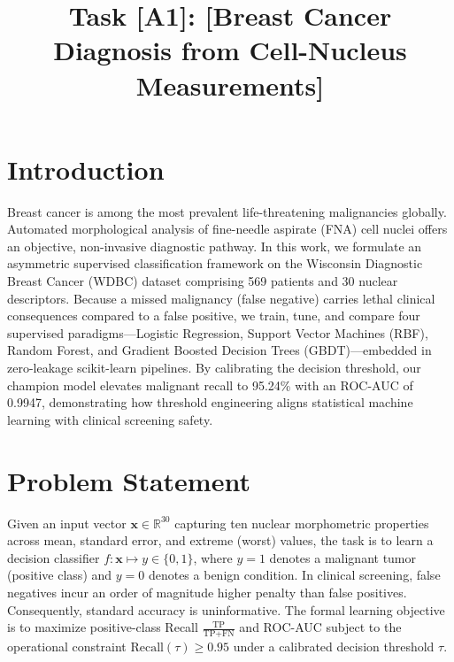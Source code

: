 \documentclass[conference]{IEEEtran}
\begin{document}
\title{Task [A1]: [Breast Cancer Diagnosis from Cell-Nucleus Measurements]}

\author{
}

\maketitle

\section{Introduction}
Breast cancer is among the most prevalent life-threatening malignancies globally. Automated morphological analysis of fine-needle aspirate (FNA) cell nuclei offers an objective, non-invasive diagnostic pathway. In this work, we formulate an asymmetric supervised classification framework on the Wisconsin Diagnostic Breast Cancer (WDBC) dataset comprising 569 patients and 30 nuclear descriptors. Because a missed malignancy (false negative) carries lethal clinical consequences compared to a false positive, we train, tune, and compare four supervised paradigms—Logistic Regression, Support Vector Machines (RBF), Random Forest, and Gradient Boosted Decision Trees (GBDT)—embedded in zero-leakage scikit-learn pipelines. By calibrating the decision threshold, our champion model elevates malignant recall to 95.24\% with an ROC-AUC of 0.9947, demonstrating how threshold engineering aligns statistical machine learning with clinical screening safety.

\section{Problem Statement}
Given an input vector $\mathbf{x} \in \mathbb{R}^{30}$ capturing ten nuclear morphometric properties across mean, standard error, and extreme (worst) values, the task is to learn a decision classifier $f: \mathbf{x} \mapsto y \in \{0, 1\}$, where $y=1$ denotes a malignant tumor (positive class) and $y=0$ denotes a benign condition. In clinical screening, false negatives incur an order of magnitude higher penalty than false positives. Consequently, standard accuracy is uninformative. The formal learning objective is to maximize positive-class Recall $\frac{\text{TP}}{\text{TP} + \text{FN}}$ and ROC-AUC subject to the operational constraint $\text{Recall}(\tau) \ge 0.95$ under a calibrated decision threshold $\tau$.
\end{document}
